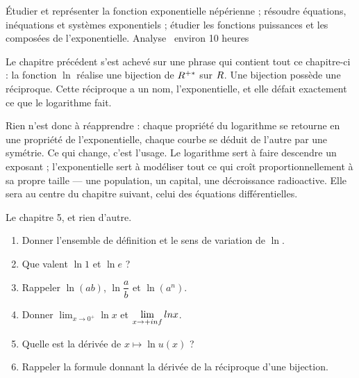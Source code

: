   {Étudier et représenter la fonction exponentielle népérienne ; résoudre
   équations, inéquations et systèmes exponentiels ; étudier les fonctions
   puissances et les composées de l'exponentielle.}
  {Analyse \textbullet\ environ 10 heures}

Le chapitre précédent s'est achevé sur une phrase qui contient tout ce
chapitre-ci : la fonction $\ln$ réalise une bijection de $R^{+*}$ sur $R$. Une
bijection possède une réciproque. Cette réciproque a un nom, l'exponentielle,
et elle défait exactement ce que le logarithme fait.

Rien n'est donc à réapprendre : chaque propriété du logarithme se retourne en
une propriété de l'exponentielle, chaque courbe se déduit de l'autre par une
symétrie. Ce qui change, c'est l'usage. Le logarithme sert à faire descendre
un exposant ; l'exponentielle sert à modéliser tout ce qui croît
proportionnellement à sa propre taille — une population, un capital, une
décroissance radioactive. Elle sera au centre du chapitre suivant, celui des
équations différentielles.

\begin{revision}
Le chapitre 5, et rien d'autre.

\begin{enumerate}[label=\textbf{\arabic*.}, leftmargin=*, itemsep=0.35em]
  \item Donner l'ensemble de définition et le sens de variation de $\ln$.
  \item Que valent $\ln 1$ et $\ln e$ ?
  \item Rappeler $\ln(ab)$, $\ln\dfrac{a}{b}$ et $\ln(a^{n})$.
  \item Donner $\displaystyle\lim_{x\to0^{+}}\ln x$ et $\limpinf \ln x$.
  \item Quelle est la dérivée de $x \mapsto \ln u(x)$ ?
  \item Rappeler la formule donnant la dérivée de la réciproque d'une
        bijection.
\end{enumerate}
\end{revision}

